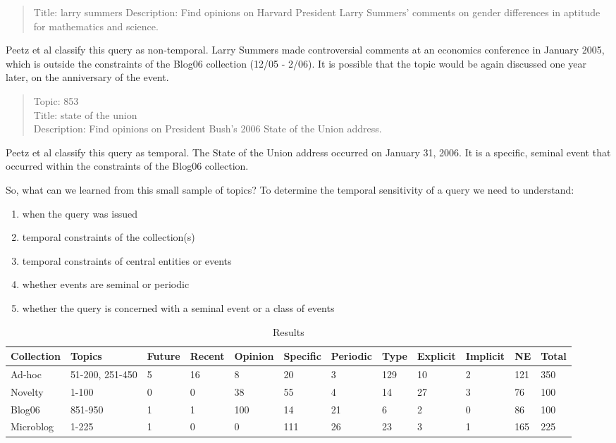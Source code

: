 \documentclass{sig-alternate}
\begin{document}
\begin{quote}
Title: larry summers	 
Description: Find opinions on Harvard President Larry Summers' comments on gender differences in aptitude for mathematics and science.
\end{quote}

Peetz et al classify this query as non-temporal.  Larry Summers made controversial comments at an economics conference in January 2005, which is outside the constraints of the Blog06 collection (12/05 - 2/06). It is possible that the topic would be again discussed one year later, on the anniversary of the event.

\begin{quote}
Topic: 853 \\
Title: state of the union \\	 
Description: Find opinions on President Bush's 2006 State of the Union address. \\
\end{quote}
Peetz et al classify this query as temporal. The State of the Union address occurred on January 31, 2006. It is a specific, seminal event that occurred within the constraints of the Blog06 collection.

So, what can we learned from this small sample of topics?   To determine the temporal sensitivity of a query we need to understand:

\begin{enumerate}
\item when the query was issued
\item temporal constraints of the collection(s)
\item temporal constraints of central entities or events
\item whether events are seminal or periodic
\item whether the query is concerned with a seminal event or a class of events
\end{enumerate}


\begin{table}
\small
\begin{tabular}{| l | l | l | l | l | l | l | l | l | l | l | l |} \hline
\bf{Collection} & \bf{Topics}   & \bf{Future} & \bf{Recent} & \bf{Opinion} & \bf{Specific} & \bf{Periodic} & \bf{Type} & \bf{Explicit} & \bf{Implicit} & \bf{NE} & \bf{Total} \\ \hline
Ad-hoc & 51-200, 251-450 & 5 & 16 & 8 & 20 & 3 & 129 & 10 & 2 & 121 & 350 \\ \hline
Novelty & 1-100 & 0 & 0 & 38 & 55 & 4 & 14 & 27 & 3 & 76 & 100\\ \hline
Blog06 & 851-950 & 1 & 1 & 100 & 14 & 21 & 6 & 2 & 0 & 86 & 100 \\ \hline
Microblog & 1-225 & 1 & 0 & 0 & 111 & 26 & 23 & 3 & 1 & 165 & 225 \\ \hline
\end{tabular}
\caption{Results}
\label{table.results}
\end{table}
\end{document}
